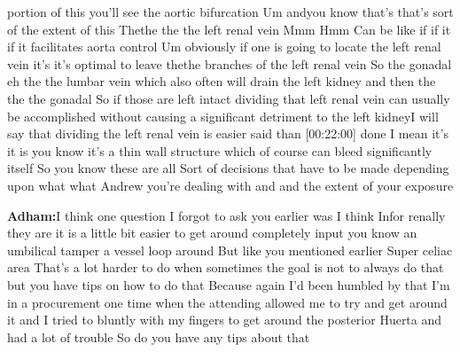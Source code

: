 \documentclass[
]{book}
\begin{document}
portion of this you'll see the aortic bifurcation Um andyou know that's
that's sort of the extent of this Thethe the the left renal vein Mmm Hmm
Can be like if if it if it facilitates aorta control Um obviously if one
is going to locate the left renal vein it's it's optimal to leave thethe
branches of the left renal vein So the gonadal eh the the lumbar vein
which also often will drain the left kidney and then the the the gonadal
So if those are left intact dividing that left renal vein can usually be
accomplished without causing a significant detriment to the left kidneyI
will say that dividing the left renal vein is easier said than
{[}00:22:00{]} done I mean it's it is you know it's a thin wall structure
which of course can bleed significantly itself So you know these are all
Sort of decisions that have to be made depending upon what what Andrew
you're dealing with and and the extent of your exposure

\textbf{Adham:}I think one question I forgot to ask you earlier was I think
Infor renally they are it is a little bit easier to get around
completely input you know an umbilical tamper a vessel loop around But
like you mentioned earlier Super celiac area That's a lot harder to do
when sometimes the goal is not to always do that but you have tips on
how to do that Because again I'd been humbled by that I'm in a
procurement one time when the attending allowed me to try and get around
it and I tried to bluntly with my fingers to get around the posterior
Huerta and had a lot of trouble So do you have any tips about that
\end{document}
